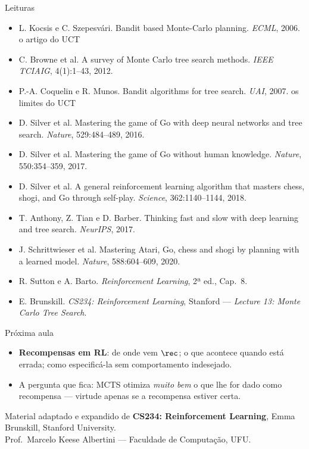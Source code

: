 \documentclass[aspectratio=169, 11pt]{beamer}
\begin{document}
\begin{frame}{Leituras}
  {\small
  \begin{itemize}\setlength{\itemsep}{0.25ex}
    \item L. Kocsis e C. Szepesvári. Bandit based Monte-Carlo planning.
          \emph{ECML}, 2006. \hfill \color{rlCinza}\scriptsize o artigo do UCT
    \item \color{black} C. Browne et al. A survey of Monte Carlo tree search
          methods. \emph{IEEE TCIAIG}, 4(1):1--43, 2012.
    \item P.-A. Coquelin e R. Munos. Bandit algorithms for tree search.
          \emph{UAI}, 2007. \hfill \color{rlCinza}\scriptsize os limites do UCT
    \item \color{black} D. Silver et al. Mastering the game of Go with deep
          neural networks and tree search. \emph{Nature}, 529:484--489, 2016.
    \item D. Silver et al. Mastering the game of Go without human knowledge.
          \emph{Nature}, 550:354--359, 2017.
    \item D. Silver et al. A general reinforcement learning algorithm that
          masters chess, shogi, and Go through self-play. \emph{Science},
          362:1140--1144, 2018.
    \item T. Anthony, Z. Tian e D. Barber. Thinking fast and slow with deep
          learning and tree search. \emph{NeurIPS}, 2017.
    \item J. Schrittwieser et al. Mastering Atari, Go, chess and shogi by
          planning with a learned model. \emph{Nature}, 588:604--609, 2020.
    \item R. Sutton e A. Barto. \emph{Reinforcement Learning}, 2ª ed., Cap.\ 8.
    \item E. Brunskill. \emph{CS234: Reinforcement Learning}, Stanford ---
          \emph{Lecture 13: Monte Carlo Tree Search}.
  \end{itemize}}
\end{frame}

\begin{frame}{Próxima aula}
  \begin{itemize}
    \item \textbf{Recompensas em RL}: de onde vem $\rec$; o que acontece quando está errada; como especificá-la sem comportamento indesejado.
    \item A pergunta que fica: MCTS otimiza \emph{muito bem} o que lhe for dado como recompensa — virtude apenas se a recompensa estiver certa.
  \end{itemize}

  \vfill
  \centering
  {\color{rlCinza}\small Material adaptado e expandido de \textbf{CS234:
  Reinforcement Learning}, Emma Brunskill, Stanford University.\\
  Prof.\ Marcelo Keese Albertini --- Faculdade de Computação, UFU.}
\end{frame}
\end{document}
